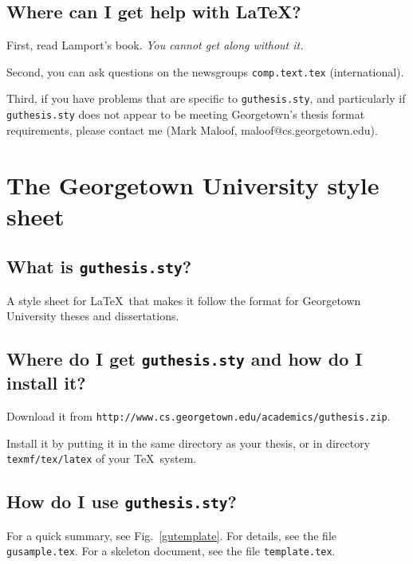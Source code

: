 \documentclass[12pt]{report}
\begin{document}
\subsection{Where can I get help with \LaTeX?}

First, read Lamport's book.  \emph{You cannot get along without it.}

Second, you can ask questions on the newsgroups {\tt comp.text.tex}
(international).

Third, if you have problems that are specific to {\tt guthesis.sty},
and particularly if {\tt guthesis.sty} does not appear to be meeting
Georgetown's thesis format requirements, please contact me
(Mark Maloof, maloof@cs.georgetown.edu).


\section{The Georgetown University style sheet}

\subsection{What is {\tt guthesis.sty}?}

A style sheet for \LaTeX\ that makes it follow the format for
Georgetown University theses and dissertations.

\subsection{Where do I get {\tt guthesis.sty} and how do I install it?}

Download it from \texttt{http://www.cs.georgetown.edu/academics/guthesis.zip}.

Install it by putting it in the same directory as your thesis, or in
directory {\tt texmf/tex/latex} of your \TeX\ system.

\subsection{How do I use {\tt guthesis.sty}?}

For a quick summary, see Fig.\ \ref{gutemplate}.
For details, see the file {\tt gusample.tex}.
For a skeleton document, see the file {\tt template.tex}.
\end{document}

